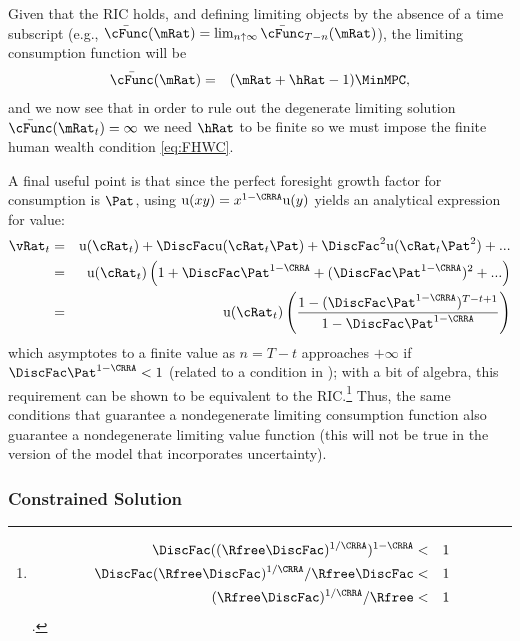 \documentclass[titlepage]{\econtex}\providecommand{\texname}{BufferStockTheory}
\begin{document}
Given that the RIC holds, and defining limiting objects by the absence of a time subscript (e.g., $\bar{\cFunc}(\mRat)=\lim_{n \uparrow \infty} \bar{\cFunc}_{T-n}(\mRat)$), the limiting consumption function will be
\begin{eqnarray}
  \bar{\cFunc}(\mRat) & = & (\mRat+\hRat-1)\MinMPC, \label{eq:cFuncPFUnc}
\end{eqnarray}
and we now see that in order to rule out the degenerate limiting
solution $\bar{\cFunc}(\mRat_{t}) = \infty$ we need $\hRat$ to be finite so we
must impose the finite human wealth condition \eqref{eq:FHWC}.

\hypertarget{ValuePFAnalytical}{}
A final useful point is that since the perfect foresight
growth factor for consumption is $\Pat$, using $\util(xy) =
x^{1-\CRRA}\util(y)$ yields an analytical expression for value:  
\begin{eqnarray}
  \vRat_{t} & = & \util(\cRat_{t})+\DiscFac \util(\cRat_{t}\Pat)+\DiscFac^{2} \util(\cRat_{t} \Pat^{2})+... \label{eq:ValuePFAnalytical}
\\ & = & \util(\cRat_{t})\left(1+\DiscFac \Pat^{1-\CRRA}+(\DiscFac \Pat^{1-\CRRA})^{2}+...\right)
\\ & = & \util(\cRat_{t})\left(\frac{1-(\DiscFac \Pat^{1-\CRRA})^{T-t+1}}{1-\DiscFac \Pat^{1-\CRRA}}\right)
\end{eqnarray}
which asymptotes to a finite value as $n=T-t$ approaches $+\infty$ if $\DiscFac \Pat^{1-\CRRA} < 1$ (related to a condition in \cite{asHomogeneous}); with a bit of algebra, this requirement can be shown to be equivalent to the RIC.\footnote{
\begin{eqnarray*}
   \DiscFac ((\Rfree \DiscFac)^{1/\CRRA})^{1-\CRRA} & < & 1
\\ \DiscFac (\Rfree\DiscFac)^{1/\CRRA}/\Rfree\DiscFac & < & 1
\\ (\Rfree \DiscFac)^{1/\CRRA} /\Rfree & < & 1
\end{eqnarray*}.
}  Thus, the same conditions that guarantee a nondegenerate limiting consumption function also guarantee a nondegenerate limiting value function (this will not be true in the version of the model that incorporates uncertainty).


\hypertarget{Constrained-Solution}{}
\subsubsection{Constrained Solution}
\end{document}
